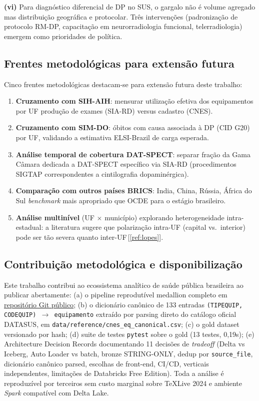 \documentclass[12pt,a4paper,oneside]{article}
\begin{document}
\textbf{(vi)} Para diagnóstico diferencial de DP no SUS, o gargalo
não é volume agregado mas distribuição geográfica e protocolar. Três
intervenções (padronização de protocolo RM-DP, capacitação em
neurorradiologia funcional, telerradiologia) emergem como
prioridades de política.

\subsection{Frentes metodológicas para extensão futura}

Cinco frentes metodológicas destacam-se para extensão futura deste
trabalho:

\begin{enumerate}
\item \textbf{Cruzamento com SIH-AIH}: mensurar utilização efetiva
dos equipamentos por UF \textemdash{} produção de exames (SIA-RD)
versus cadastro (CNES).
\item \textbf{Cruzamento com SIM-DO}: óbitos com causa associada à
DP (CID G20) por UF, validando a estimativa ELSI-Brazil de carga
esperada.
\item \textbf{Análise temporal de cobertura DAT-SPECT}: separar
fração da Gama Câmara dedicada a DAT-SPECT específico via SIA-RD
(procedimentos SIGTAP correspondentes a cintilografia
dopaminérgica).
\item \textbf{Comparação com outros países BRICS}: India, China,
Rússia, África do Sul \textemdash{} \textit{benchmark} mais
apropriado que OCDE para o estágio brasileiro.
\item \textbf{Análise multinível} (UF $\times$ município) explorando
heterogeneidade intra-estadual: a literatura sugere que polarização
intra-UF (capital vs.\ interior) pode ser tão severa quanto
inter-UF\,[\ref{ref:lopes}].
\end{enumerate}

\subsection{Contribuição metodológica e disponibilização}

Este trabalho contribui ao ecossistema analítico de saúde pública
brasileira ao publicar abertamente: (a) o pipeline reprodutível
medallion completo em
\href{https://github.com/leonardochalhoub/mirante-dos-dados-br}{repositório
Git público}; (b) o dicionário canônico de 133 entradas
\texttt{(TIPEQUIP, CODEQUIP) $\to$ equipamento} extraído por parsing
direto do catálogo oficial DATASUS, em
\texttt{data/reference/cnes\_eq\_canonical.csv};  (c) o gold dataset
versionado por hash; (d) suite de testes \texttt{pytest} sobre o
gold (13 testes, 0,19s); (e) Architecture Decision Records
documentando 11 decisões de \textit{tradeoff} (Delta vs Iceberg,
Auto Loader vs batch, bronze STRING-ONLY, dedup por
\texttt{source\_file}, dicionário canônico parsed, escolhas de
front-end, CI/CD, verticais independentes, limitações de
Databricks Free Edition). Toda a análise é reproduzível por
terceiros sem custo marginal sobre TeXLive 2024 e ambiente
\textit{Spark} compatível com Delta Lake.
\end{document}
